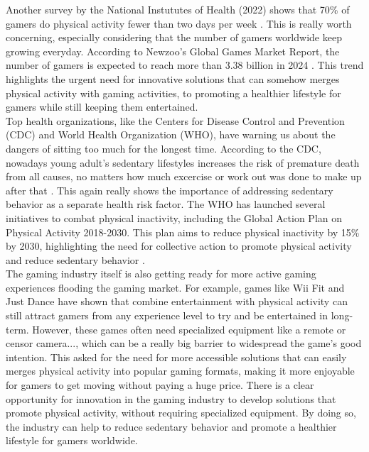 \documentclass[12pt]{article}
\begin{document}
Another survey by the National Instututes of Health (2022) shows that 70\% of gamers do physical activity fewer than two days per week \cite{klasnja2022}. This is really worth concerning, especially considering that the number of gamers worldwide keep growing everyday.
According to Newzoo's Global Games Market Report, the number of gamers is expected to reach more than 3.38 billion in 2024 \cite{wijman2023}. This trend highlights the urgent need for innovative solutions that can somehow merges physical activity with gaming activities, to promoting a healthier lifestyle for gamers while still keeping them entertained.\\

Top health organizations, like the Centers for Disease Control and Prevention (CDC) and World Health Organization (WHO), have warning us about the dangers of sitting too much for the longest time.
According to the CDC, nowadays young adult's sedentary lifestyles increases the risk of premature death from all causes, no matters how much excercise or work out was done to make up after that \cite{carlson2018}. This again really shows the importance of addressing sedentary behavior as a separate health risk factor.
The WHO has launched several initiatives to combat physical inactivity, including the Global Action Plan on Physical Activity 2018-2030. This plan aims to reduce physical inactivity by 15\% by 2030, highlighting the need for collective action to promote physical activity and reduce sedentary behavior \cite{who2017}.\\

The gaming industry itself is also getting ready for more active gaming experiences flooding the gaming market. For example, games like Wii Fit and Just Dance have shown that combine entertainment with physical activity can still attract gamers from any experience level to try and be entertained in long-term.
However, these games often need specialized equipment like a remote or censor camera..., which can be a really big barrier to widespread the game's good intention. This asked for the need for more accessible solutions that can easily merges physical activity into popular gaming formats, making it more enjoyable for gamers to get moving without paying a huge price.
There is a clear opportunity for innovation in the gaming industry to develop solutions that promote physical activity, without requiring specialized equipment. By doing so, the industry can help to reduce sedentary behavior and promote a healthier lifestyle for gamers worldwide.\\
\end{document}
